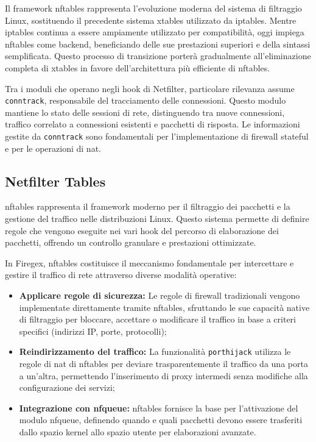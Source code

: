 Il framework \gls{nftables} rappresenta l'evoluzione moderna del sistema di filtraggio Linux, sostituendo il precedente sistema xtables utilizzato da iptables. Mentre iptables continua a essere ampiamente utilizzato per compatibilità, oggi impiega \gls{nftables} come backend, beneficiando delle sue prestazioni superiori e della sintassi semplificata. Questo processo di transizione porterà gradualmente all'eliminazione completa di xtables in favore dell'architettura più efficiente di \gls{nftables}.

Tra i moduli che operano negli hook di Netfilter, particolare rilevanza assume \texttt{conntrack}, responsabile del tracciamento delle connessioni. Questo modulo mantiene lo stato delle sessioni di rete, distinguendo tra nuove connessioni, traffico correlato a connessioni esistenti e pacchetti di risposta. Le informazioni gestite da \texttt{conntrack} sono fondamentali per l'implementazione di firewall stateful e per le operazioni di \gls{nat}.

\subsection{Netfilter Tables}

\gls{nftables} rappresenta il framework moderno per il filtraggio dei pacchetti e la gestione del traffico nelle distribuzioni Linux. Questo sistema permette di definire regole che vengono eseguite nei vari hook del percorso di elaborazione dei pacchetti, offrendo un controllo granulare e prestazioni ottimizzate.

In Firegex, \gls{nftables} costituisce il meccanismo fondamentale per intercettare e gestire il traffico di rete attraverso diverse modalità operative:

\begin{itemize}
    \item \textbf{Applicare regole di sicurezza:} Le regole di firewall tradizionali vengono implementate direttamente tramite \gls{nftables}, sfruttando le sue capacità native di filtraggio per bloccare, accettare o modificare il traffico in base a criteri specifici (indirizzi IP, porte, protocolli);
    
    \item \textbf{Reindirizzamento del traffico:} La funzionalità \texttt{\gls{porthijack}} utilizza le regole di \gls{nat} di \gls{nftables} per deviare trasparentemente il traffico da una porta a un'altra, permettendo l'inserimento di proxy intermedi senza modifiche alla configurazione dei servizi;
    
    \item \textbf{Integrazione con \gls{nfqueue}:} \gls{nftables} fornisce la base per l'attivazione del modulo \gls{nfqueue}, definendo quando e quali pacchetti devono essere trasferiti dallo spazio kernel allo spazio utente per elaborazioni avanzate.
\end{itemize}

